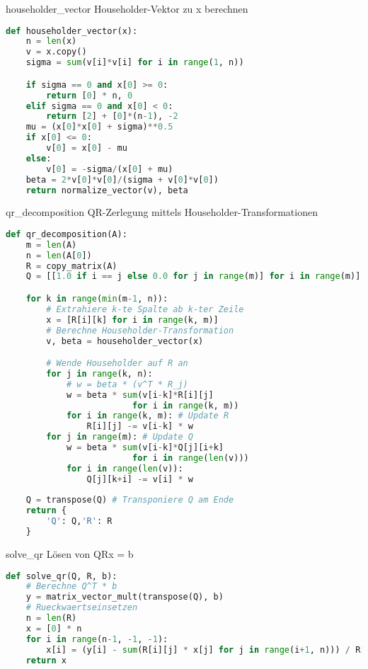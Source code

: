 \begin{examplecode}{householder\_vector} Householder-Vektor zu x berechnen
\begin{lstlisting}[language=Python, style=basesmol]
def householder_vector(x):
    n = len(x)
    v = x.copy()
    sigma = sum(v[i]*v[i] for i in range(1, n))

    if sigma == 0 and x[0] >= 0:
        return [0] * n, 0
    elif sigma == 0 and x[0] < 0:
        return [2] + [0]*(n-1), -2
    mu = (x[0]*x[0] + sigma)**0.5
    if x[0] <= 0:
        v[0] = x[0] - mu
    else:
        v[0] = -sigma/(x[0] + mu)
    beta = 2*v[0]*v[0]/(sigma + v[0]*v[0])
    return normalize_vector(v), beta
\end{lstlisting}
\end{examplecode}

\begin{examplecode}{qr\_decomposition} QR-Zerlegung mittels Householder-Transformationen
\begin{lstlisting}[language=Python, style=basesmol]
def qr_decomposition(A):
    m = len(A)
    n = len(A[0])
    R = copy_matrix(A)
    Q = [[1.0 if i == j else 0.0 for j in range(m)] for i in range(m)]

    for k in range(min(m-1, n)):
        # Extrahiere k-te Spalte ab k-ter Zeile
        x = [R[i][k] for i in range(k, m)]
        # Berechne Householder-Transformation
        v, beta = householder_vector(x)

        # Wende Householder auf R an
        for j in range(k, n):
            # w = beta * (v^T * R_j)
            w = beta * sum(v[i-k]*R[i][j] 
                         for i in range(k, m))
            for i in range(k, m): # Update R
                R[i][j] -= v[i-k] * w
        for j in range(m): # Update Q
            w = beta * sum(v[i-k]*Q[j][i+k] 
                         for i in range(len(v)))
            for i in range(len(v)):
                Q[j][k+i] -= v[i] * w
    
    Q = transpose(Q) # Transponiere Q am Ende
    return {
        'Q': Q,'R': R
    }
\end{lstlisting}
\end{examplecode}

\begin{examplecode}{solve\_qr} Lösen von QRx = b
\begin{lstlisting}[language=Python, style=basesmol]
def solve_qr(Q, R, b):
    # Berechne Q^T * b
    y = matrix_vector_mult(transpose(Q), b)
    # Rueckwaertseinsetzen
    n = len(R)
    x = [0] * n
    for i in range(n-1, -1, -1):
        x[i] = (y[i] - sum(R[i][j] * x[j] for j in range(i+1, n))) / R[i][i]
    return x
\end{lstlisting}
\end{examplecode}

